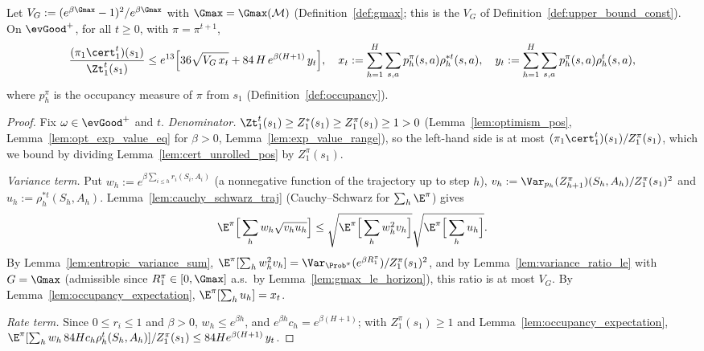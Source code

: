 \begin{lemma}\label{lem:ratio_bound_pos}
\leanok
{}
Let $V_G := (e^{\beta\Gmax} - 1)^2/e^{\beta\Gmax}$ with $\Gmax = \Gmax(\mathcal M)$ (Definition~\ref{def:gmax};
this is the $V_G$ of Definition~\ref{def:upper_bound_const}). On $\evGood^+$, for all $t \ge 0$, with
$\pi = \pi^{t+1}$,
\[
  \frac{(\pi_1\cert_1^t)(s_1)}{\Zt_1^t(s_1)} \le e^{13}\Big[36\sqrt{V_G\,x_t} + 84\,H\,e^{\beta(H+1)}\,y_t\Big],
  \quad
  x_t := \sum_{h=1}^H\sum_{s,a} p^\pi_h(s,a)\rho^{*t}_h(s,a), \quad
  y_t := \sum_{h=1}^H\sum_{s,a} p^\pi_h(s,a)\rho^t_h(s,a),
\]
where $p^\pi_h$ is the occupancy measure of $\pi$ from $s_1$ (Definition~\ref{def:occupancy}).
\end{lemma}

\begin{proof}
\leanok
Fix $\omega \in \evGood^+$ and $t$. \emph{Denominator.} $\Zt_1^t(s_1) \ge Z^*_1(s_1) \ge Z^\pi_1(s_1) \ge 1 > 0$
(Lemma~\ref{lem:optimism_pos}, Lemma~\ref{lem:opt_exp_value_eq} for $\beta > 0$,
Lemma~\ref{lem:exp_value_range}), so the left-hand side is at most $(\pi_1\cert_1^t)(s_1)/Z^\pi_1(s_1)$,
which we bound by dividing Lemma~\ref{lem:cert_unrolled_pos} by $Z^\pi_1(s_1)$.

\emph{Variance term.} Put $w_h := e^{\beta\sum_{i \le h} r_i(S_i,A_i)}$ (a nonnegative function of the
trajectory up to step $h$), $v_h := \Var_{p_h}(Z^\pi_{h+1})(S_h,A_h)/Z^\pi_1(s_1)^2$ and
$u_h := \rho^{*t}_h(S_h,A_h)$. Lemma~\ref{lem:cauchy_schwarz_traj} (Cauchy--Schwarz for $\sum_h\E^\pi$) gives
\[
  \E^\pi\Big[\sum_h w_h\sqrt{v_hu_h}\Big] \le \sqrt{\E^\pi\Big[\sum_h w_h^2v_h\Big]}\sqrt{\E^\pi\Big[\sum_h u_h\Big]} .
\]
By Lemma~\ref{lem:entropic_variance_sum},
$\E^\pi[\sum_h w_h^2 v_h] = \Var_{\Prob^\pi}(e^{\beta R_1^\pi})/Z^\pi_1(s_1)^2$, and by
Lemma~\ref{lem:variance_ratio_le} with $G = \Gmax$ (admissible since $R_1^\pi \in [0, \Gmax]$ a.s.\ by
Lemma~\ref{lem:gmax_le_horizon}), this ratio is at most $V_G$. By Lemma~\ref{lem:occupancy_expectation},
$\E^\pi[\sum_h u_h] = x_t$.

\emph{Rate term.} Since $0 \le r_i \le 1$ and $\beta > 0$, $w_h \le e^{\beta h}$, and $e^{\beta h}c_h = e^{\beta(H+1)}$;
with $Z^\pi_1(s_1) \ge 1$ and Lemma~\ref{lem:occupancy_expectation},
$\E^\pi[\sum_h w_h\,84Hc_h\rho^t_h(S_h,A_h)]/Z^\pi_1(s_1) \le 84He^{\beta(H+1)}\,y_t$.
\end{proof}

